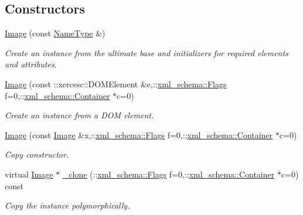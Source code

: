 \subsection*{Constructors}
\begin{DoxyCompactItemize}
\item 
\hypertarget{classopenstack_1_1xml_1_1Image_af4c9d6a49f6d01cf5d87bdf36248abec}{
\hyperlink{classopenstack_1_1xml_1_1Image_af4c9d6a49f6d01cf5d87bdf36248abec}{Image} (const \hyperlink{classopenstack_1_1xml_1_1Image_a42af9ebe76367af835ffe29c820bdc3b}{NameType} \&)}
\label{classopenstack_1_1xml_1_1Image_af4c9d6a49f6d01cf5d87bdf36248abec}

\begin{DoxyCompactList}\small\item\em Create an instance from the ultimate base and initializers for required elements and attributes. \item\end{DoxyCompactList}\item 
\hyperlink{classopenstack_1_1xml_1_1Image_a4b2277987d6761b4506d674d90d5c2d6}{Image} (const ::xercesc::DOMElement \&e,::\hyperlink{namespacexml__schema_affb4c227cbd9aa7453dd1dc5a1401943}{xml\_\-schema::Flags} f=0,::\hyperlink{namespacexml__schema_a333dea2213742aea47a37532dec4ec27}{xml\_\-schema::Container} $\ast$c=0)
\begin{DoxyCompactList}\small\item\em Create an instance from a DOM element. \item\end{DoxyCompactList}\item 
\hyperlink{classopenstack_1_1xml_1_1Image_a2b1fe21a55035e6d43c64a039c731d62}{Image} (const \hyperlink{classopenstack_1_1xml_1_1Image}{Image} \&x,::\hyperlink{namespacexml__schema_affb4c227cbd9aa7453dd1dc5a1401943}{xml\_\-schema::Flags} f=0,::\hyperlink{namespacexml__schema_a333dea2213742aea47a37532dec4ec27}{xml\_\-schema::Container} $\ast$c=0)
\begin{DoxyCompactList}\small\item\em Copy constructor. \item\end{DoxyCompactList}\item 
virtual \hyperlink{classopenstack_1_1xml_1_1Image}{Image} $\ast$ \hyperlink{classopenstack_1_1xml_1_1Image_a94a9229d3edfb50a07caec5a80970573}{\_\-clone} (::\hyperlink{namespacexml__schema_affb4c227cbd9aa7453dd1dc5a1401943}{xml\_\-schema::Flags} f=0,::\hyperlink{namespacexml__schema_a333dea2213742aea47a37532dec4ec27}{xml\_\-schema::Container} $\ast$c=0) const 
\begin{DoxyCompactList}\small\item\em Copy the instance polymorphically. \item\end{DoxyCompactList}\end{DoxyCompactItemize}


